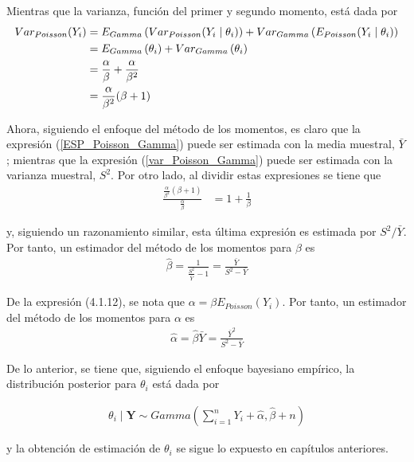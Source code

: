 \documentclass[10pt,openright]{book}\usepackage[]{graphicx}\usepackage[]{color}
\begin{document}
Mientras que la varianza, funci\'on del primer y segundo momento, est\'a dada por
\begin{align}\label{var_Poisson_Gamma}
Var_{Poisson}(Y_i)&=E_{Gamma}\left(Var_{Poisson}(Y_i \mid \theta_i)\right)+Var_{Gamma}\left(E_{Poisson}(Y_i \mid \theta_i)\right) \notag \\
&=E_{Gamma}\left(\theta_i\right)+Var_{Gamma}\left(\theta_i\right) \notag \\
&=\frac{\alpha}{\beta}+\frac{\alpha}{\beta^2} \notag \\
&=\frac{\alpha}{\beta^2}(\beta+1)
\end{align}

Ahora, siguiendo el enfoque del m\'etodo de los momentos, es claro que la expresi\'on (\ref{ESP_Poisson_Gamma}) puede ser estimada con  la media muestral, $\bar{Y}$; mientras que la expresi\'on (\ref{var_Poisson_Gamma}) puede ser estimada con la varianza muestral, $S^2$. Por otro lado, al dividir estas expresiones se tiene que
\begin{align}
\frac{\frac{\alpha}{\beta^2}(\beta+1)}{\frac{\alpha}{\beta}}
&=1+\frac{1}{\beta}
\end{align}

y, siguiendo un razonamiento similar, esta \'ultima expresi\'on es estimada por $S^2/\bar{Y}$. Por tanto, un estimador del m\'etodo de los momentos para $\beta$ es
\begin{align}
\hat{\beta}=\frac{1}{\frac{S^2}{\bar{Y}}-1}=\frac{\bar{Y}}{S^2-\bar{Y}}
\end{align}

De la expresi\'on (4.1.12), se nota que $\alpha=\beta E_{Poisson}(Y_i)$. Por tanto, un estimador del m\'etodo de los momentos para $\alpha$ es
\begin{align}
\hat{\alpha}=\hat{\beta}\bar{Y}=\frac{\bar{Y}^2}{S^2-\bar{Y}}
\end{align}

De lo anterior, se tiene que, siguiendo el enfoque bayesiano emp\'irico, la distribuci\'on posterior para $\theta_i$ est\'a dada por

\begin{align*}
\theta_i \mid \mathbf{Y} \sim Gamma\left(\sum_{i=1}^n Y_i+\hat{\alpha},\hat{\beta}+n\right)
\end{align*}

y la obtenci\'on de estimaci\'on de $\theta_i$ se sigue lo expuesto en cap\'itulos anteriores.
\end{document}
